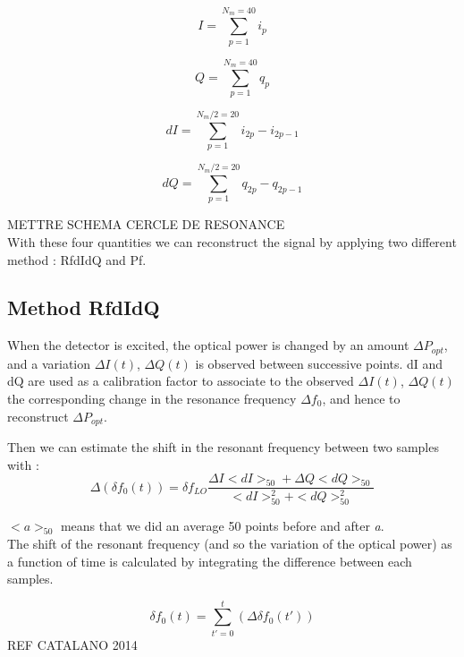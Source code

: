 \documentclass[english,11pt]{report}
\begin{document}
\begin{equation}
I = \sum^{N_{m}=40}_{p=1} i_{p}
\end{equation}

\begin{equation}
Q = \sum^{N_{m}=40}_{p=1} q_{p}
\end{equation}

\begin{equation}
dI = \sum^{N_{m}/2=20}_{p=1} i_{2p} - i_{2p-1}
\end{equation}

\begin{equation}
dQ = \sum^{N_{m}/2=20}_{p=1} q_{2p} - q_{2p-1}
\end{equation}

METTRE SCHEMA CERCLE DE RESONANCE\\

With these four quantities we can reconstruct the signal by applying two different method : RfdIdQ and Pf. 

\subsection{Method RfdIdQ}
When the detector is excited, the optical power is changed by an amount $\Delta P_{opt}$, and a variation $\Delta I(t)$, $\Delta Q(t)$ is observed between successive points. 
dI and dQ are used as a calibration factor to associate to the observed $\Delta I(t)$, $\Delta Q(t)$ the corresponding change in the resonance frequency $\Delta f_{0}$, and hence to reconstruct $\Delta P_{opt}$.

Then we can estimate the shift in the resonant frequency between two samples with : 
\begin{equation}
\Delta (\delta f_{0}(t)) = \delta f_{LO} \frac{\Delta I<dI>_{50} + \Delta Q<dQ>_{50} }{<dI>_{50}^{2} + <dQ>_{50}^{2}}
\end{equation}

$< a >_{50}$ means that we did an average 50 points before and after \textit{a}.\\

The shift of the resonant frequency (and so the variation of the optical power) as a function of time is calculated by integrating the difference between each samples.

\begin{equation}
\delta f_{0}(t) = \sum^{t}_{t'=0} (\Delta \delta f_{0}(t'))
\end{equation}
REF CATALANO 2014
\end{document}
